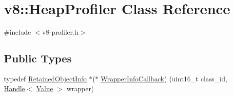\hypertarget{classv8_1_1_heap_profiler}{}\section{v8\+:\+:Heap\+Profiler Class Reference}
\label{classv8_1_1_heap_profiler}


{\ttfamily \#include $<$v8-\/profiler.\+h$>$}

\subsection*{Public Types}
\begin{DoxyCompactItemize}
\item 
typedef \hyperlink{classv8_1_1_retained_object_info}{Retained\+Object\+Info} $\ast$($\ast$ \hyperlink{classv8_1_1_heap_profiler_a696d8d6590879eeb5a4ad2814eafb599}{Wrapper\+Info\+Callback}) (uint16\+\_\+t class\+\_\+id, \hyperlink{classv8_1_1_handle}{Handle}$<$ \hyperlink{classv8_1_1_value}{Value} $>$ wrapper)
\end{DoxyCompactItemize}
